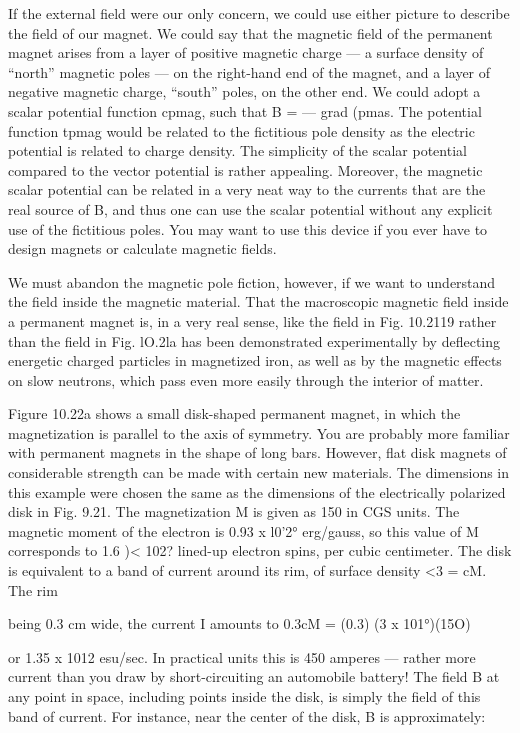 {If the external field were our only concern, we could use either
picture to describe the field of our magnet. We could say that the
magnetic field of the permanent magnet arises from a layer of positive
magnetic charge --- a surface density of ``north'' magnetic poles --- 
on the right-hand end of the magnet, and a layer of negative magnetic
charge, ``south'' poles, on the other end. We could adopt a scalar
potential function cpmag, such that B =  --- grad (pmas. The potential
function tpmag would be related to the fictitious pole density as the
electric potential is related to charge density. The simplicity of the
scalar potential compared to the vector potential is rather appealing.
Moreover, the magnetic scalar potential can be related in a very neat
way to the currents that are the real source of B, and thus one can use
the scalar potential without any explicit use of the fictitious poles.
You may want to use this device if you ever have to design magnets
or calculate magnetic fields.

We must abandon the magnetic pole fiction, however, if we want
to understand the field inside the magnetic material. That the
macroscopic magnetic field inside a permanent magnet is, in a very
real sense, like the field in Fig. 10.2119 rather than the field in
Fig. lO.2la has been demonstrated experimentally by deflecting
energetic charged particles in magnetized iron, as well as by the magnetic
effects on slow neutrons, which pass even more easily through
the interior of matter.

Figure 10.22a shows a small disk-shaped permanent magnet, in
which the magnetization is parallel to the axis of symmetry. You
are probably more familiar with permanent magnets in the shape of
long bars. However, flat disk magnets of considerable strength can
be made with certain new materials. The dimensions in this example
were chosen the same as the dimensions of the electrically polarized
disk in Fig. 9.21. The magnetization M is given as 150 in
CGS units. The magnetic moment of the electron is 0.93 x l0'2°
erg/gauss, so this value of M corresponds to 1.6 )< 102? lined-up
electron spins, per cubic centimeter. The disk is equivalent to a
band of current around its rim, of surface density <3 = cM. The rim

being 0.3 cm wide, the current I amounts to
0.3cM = (0.3) (3 x 101°)(15O)

or 1.35 x 1012 esu/sec. In practical units this is 450 amperes --- 
rather more current than you draw by short-circuiting an automobile
battery! The field B at any point in space, including points inside
the disk, is simply the field of this band of current. For instance,
near the center of the disk, B is approximately:
\begin{equation}
\end{equation}

}

